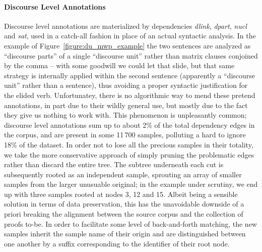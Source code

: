 \paragraph{Discourse Level Annotations}
Discourse level annotations are materialized by dependencies \textit{dlink}, \textit{dpart}, \textit{nucl} and \textit{sat}, used in a catch-all fashion in place of an actual syntactic analysis.
In the example of Figure~\ref{figure:du_mwp_example} the two sentences are analyzed as ``discourse parts'' of a single ``discourse unit'' rather than matrix clauses conjoined by the comma -- with some goodwill we could let that slide, but that same strategy is internally applied within the second sentence (apparently a ``discourse unit'' rather than a sentence), thus avoiding a proper syntactic justification for the elided verb. 
Unfortunatey, there is no algorithmic way to mend these pretend annotations, in part due to their wildly general use, but mostly due to the fact they give us nothing to work with.
This phenomenon is unpleasantly common; discourse level annotations sum up to about 2\% of the total dependency edges in the corpus, and are present in some 11\,700 samples, polluting a hard to ignore 18\% of the dataset.
In order not to lose all the precious samples in their totality, we take the more conservative approach of simply pruning the problematic edges rather than discard the entire tree.
The subtree underneath each cut is subsequently rooted as an independent sample, sprouting an array of smaller samples from the larger unusuable original; in the example under scrutiny, we end up with three samples rooted at nodes 3, 12 and 15.
Albeit being a sensible solution in terms of data preservation, this has the unavoidable downside of a priori breaking the alignment between the source corpus and the collection of proofs to-be.
In order to facilitate some level of back-and-forth matching, the new samples inherit the sample name of their origin and are distinguished between one another by a suffix corresponding to the identifier of their root node.

